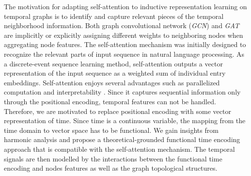 \documentclass{article} %
\begin{document}
The motivation for adapting self-attention to inductive representation learning on temporal graphs is to identify and capture relevant pieces of the temporal neighborhood information. Both graph convolutional network (\textsl{GCN}) \citep{kipf2016semi} and \textsl{GAT} are implicitly or explicitly assigning different weights to neighboring nodes \citep{velivckovic2017graph} when aggregating node features.
The self-attention mechanism was initially designed to recognize the relevant parts of input sequence in natural language processing. 
As a discrete-event sequence learning method, self-attention outputs a vector representation of the input sequence as a weighted sum of individual entry embeddings. Self-attention enjoys several advantages such as parallelized computation and interpretability \citep{vaswani2017attention}. 
Since it captures sequential information only through the positional encoding, temporal features can not be handled.
Therefore, we are motivated to replace positional encoding with some vector representation of time. Since time is a continuous variable, the mapping from the time domain to vector space has to be functional. We gain insights from harmonic analysis and propose a theoretical-grounded functional time encoding approach that is compatible with the self-attention mechanism. The temporal signals are then modelled by the interactions between the functional time encoding and nodes features as well as the graph topological structures. 
\end{document}
